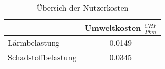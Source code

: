 %
%
%
%

\begin{table}[h!]
\center
\renewcommand{\arraystretch}{1.4}
\begin{tabular}{l|c}
            			& Umweltkosten   $\frac{CHF}{Pkm}$	       \\ \hline
Lärmbelastung           &      	0.0149 								\\
Schadstoffbelastung	    &       0.0345          		                     		                       
\end{tabular}
\caption{Übersich der Nutzerkosten}
\label{tab:t-04-03-01-Umwelt}
\end{table}

%
%





%


